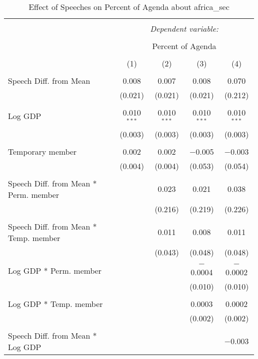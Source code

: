 
\begin{table}[!htbp] \centering 
  \caption{Effect of Speeches on Percent of Agenda about africa_sec} 
  \label{} 
\begin{tabular}{@{\extracolsep{5pt}}lcccc} 
\\[-1.8ex]\hline 
\hline \\[-1.8ex] 
 & \multicolumn{4}{c}{\textit{Dependent variable:}} \\ 
\cline{2-5} 
\\[-1.8ex] & \multicolumn{4}{c}{Percent of Agenda} \\ 
\\[-1.8ex] & (1) & (2) & (3) & (4)\\ 
\hline \\[-1.8ex] 
 Speech Diff. from Mean & 0.008 & 0.007 & 0.008 & 0.070 \\ 
  & (0.021) & (0.021) & (0.021) & (0.212) \\ 
  & & & & \\ 
 Log GDP & 0.010$^{***}$ & 0.010$^{***}$ & 0.010$^{***}$ & 0.010$^{***}$ \\ 
  & (0.003) & (0.003) & (0.003) & (0.003) \\ 
  & & & & \\ 
 Temporary member & 0.002 & 0.002 & $-$0.005 & $-$0.003 \\ 
  & (0.004) & (0.004) & (0.053) & (0.054) \\ 
  & & & & \\ 
 Speech Diff. from Mean * Perm. member &  & 0.023 & 0.021 & 0.038 \\ 
  &  & (0.216) & (0.219) & (0.226) \\ 
  & & & & \\ 
 Speech Diff. from Mean * Temp. member &  & 0.011 & 0.008 & 0.011 \\ 
  &  & (0.043) & (0.048) & (0.048) \\ 
  & & & & \\ 
 Log GDP * Perm. member &  &  & $-$0.0004 & $-$0.0002 \\ 
  &  &  & (0.010) & (0.010) \\ 
  & & & & \\ 
 Log GDP * Temp. member &  &  & 0.0003 & 0.0002 \\ 
  &  &  & (0.002) & (0.002) \\ 
  & & & & \\ 
 Speech Diff. from Mean * Log GDP &  &  &  & $-$0.003 \\ 

\end{tabular}
\end{table}
